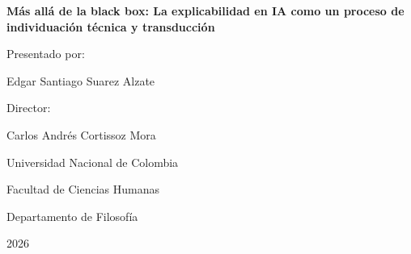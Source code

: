\begin{titlepage}
    \centering
    \vspace*{1cm}

    \vfill

    {\Large \bfseries Más allá de la black box: La explicabilidad en IA como un proceso de individuación técnica y transducción\par}

    \vfill

    {\large Presentado por:\par}
    {\large Edgar Santiago Suarez Alzate\par}

    \vspace{2cm}

    {\large Director:\par}
    {\large Carlos Andrés Cortissoz Mora\par}
    
    \vspace{2cm}

    {\large Universidad Nacional de Colombia\par}
    {\large Facultad de Ciencias Humanas\par}
    {\large Departamento de Filosofía\par}
    {\large 2026\par}

    \vfill

    

\end{titlepage}
